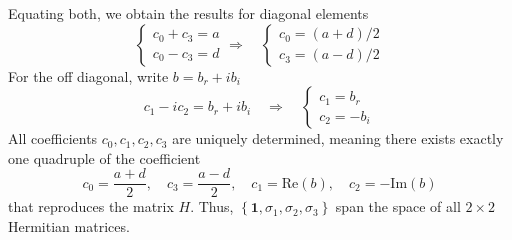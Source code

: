 \documentclass[../../../main.tex]{subfiles}
\begin{document}
Equating both, we obtain the results for diagonal elements
\begin{equation*}
    \begin{cases}
        c_0 + c_3 = a \\
        c_0 - c_3 = d
    \end{cases}
    \Rightarrow
    \quad
    \begin{cases}
        c_0 = (a+d)/2 \\
        c_3 = (a-d)/2
    \end{cases}
\end{equation*}
For the off diagonal, write $b=b_r+ib_i $
\begin{equation*}
    c_1 - i c_2 = b_r + i b_i
    \quad
    \Rightarrow
    \quad
    \begin{cases}
        c_1 = b_r \\
        c_2 = -b_i
    \end{cases}
\end{equation*}
All coefficients $c_0, c_1, c_2, c_3$ are uniquely determined, meaning there exists exactly one quadruple of the coefficient
\begin{equation*}
    c_0 = \frac{a + d}{2}, \quad c_3 = \frac{a - d}{2}, \quad c_1 = \mathrm{Re}(b), \quad c_2 = -\mathrm{Im}(b)
\end{equation*}
that reproduces the matrix $H$.
Thus, $\left\{ \mathbf{1 },\sigma_1 ,\sigma_2,\sigma_3\right\} $ span the space of all $2 \times 2$ Hermitian matrices.
\end{document}
